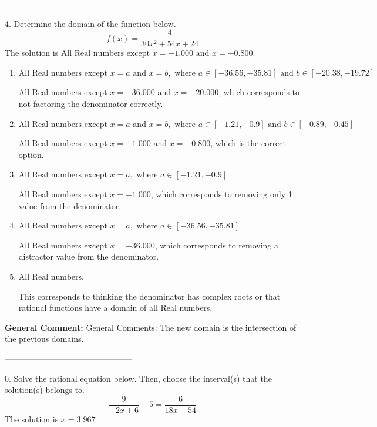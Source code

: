 \documentclass{extbook}[14pt]
\begin{document}
-----------------------------------------------

4. Determine the domain of the function below.
\[ f(x) = \frac{4}{30x^{2} +54 x + 24} \] 
The solution is $ \text{All Real numbers except } x = -1.000 \text{ and } x = -0.800. $ 

\begin{enumerate}[label=\Alph*.] 
\item $ \text{All Real numbers except } x = a \text{ and } x = b, \text{ where } a \in [-36.56, -35.81] \text{ and } b \in [-20.38, -19.72] $ 

 All Real numbers except $x = -36.000$ and $x = -20.000$, which corresponds to not factoring the denominator correctly. 
\item $ \text{All Real numbers except } x = a \text{ and } x = b, \text{ where } a \in [-1.21, -0.9] \text{ and } b \in [-0.89, -0.45] $ 

 All Real numbers except $x = -1.000$ and $x = -0.800$, which is the correct option. 
\item $ \text{All Real numbers except } x = a, \text{ where } a \in [-1.21, -0.9] $ 

 All Real numbers except $x = -1.000$, which corresponds to removing only 1 value from the denominator. 
\item $ \text{All Real numbers except } x = a, \text{ where } a \in [-36.56, -35.81] $ 

 All Real numbers except $x = -36.000$, which corresponds to removing a distractor value from the denominator. 
\item $ \text{All Real numbers.} $ 

 This corresponds to thinking the denominator has complex roots or that rational functions have a domain of all Real numbers. 
\end{enumerate} 
 
\textbf{General Comment:} General Comments: The new domain is the intersection of the previous domains. 

-----------------------------------------------

0. Solve the rational equation below. Then, choose the interval(s) that the solution(s) belongs to.
\[ \frac{9}{-2x + 6} + 5 = \frac{6}{18x -54} \] 
The solution is $ x = 3.967 $ 
\end{document}
